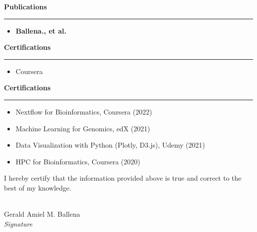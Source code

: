 \documentclass[a4paper,10pt]{article}
\newcommand{\sectiontitle}[1]{\vspace{10pt}\textbf{\Large #1}\vspace{5pt}\hrule\vspace{10pt}}
\begin{document}
	
	\sectiontitle{Publications}
	\begin{itemize}[left=0pt]
		\item \textbf{Ballena., et al.} 
	\end{itemize}
	
	\sectiontitle{Certifications}
	\begin{itemize}[left=0pt]
		\item Coursera
	\end{itemize}
	
	
	\sectiontitle{Certifications}
	\begin{itemize}[left=0pt]
		\item Nextflow for Bioinformatics, Coursera (2022)
		\item Machine Learning for Genomics, edX (2021)
		\item Data Visualization with Python (Plotly, D3.js), Udemy (2021)
		\item HPC for Bioinformatics, Coursera (2020)
	\end{itemize}
	
	\vspace{20pt}
	\noindent I hereby certify that the information provided above is true and correct to the best of my knowledge.
	
	\vspace{40pt}
	\noindent\makebox[2in]{\hrulefill} \\
	Gerald Amiel M. Ballena\\
	\textit{Signature}
	
	
\end{document}
